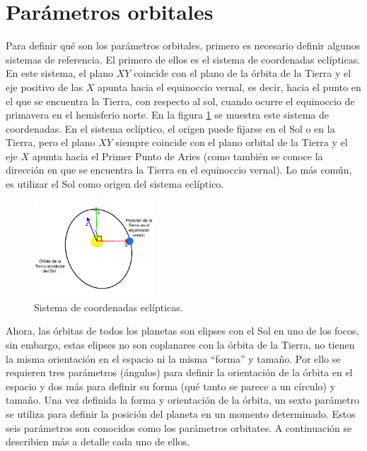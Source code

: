 \documentclass[a4paper,10pt]{article}
\begin{document}
\section{Parámetros orbitales}
Para definir qué son los parámetros orbitales, primero es necesario definir algunos sistemas de referencia. El primero de ellos es el sistema de coordenadas eclípticas. En este sistema, el plano $XY$ coincide con el plano de la órbita de la Tierra y el eje positivo de las $X$ apunta hacia el equinoccio vernal, es decir, hacia el punto en el que se encuentra la Tierra, con respecto al sol, cuando ocurre el equinoccio de primavera en el hemisferio norte. En la figura \ref{fig:EclipticFrame} se muestra este sistema de coordenadas. En el sistema eclíptico, el origen puede fijarse en el Sol o en la Tierra, pero el plano $XY$ siempre coincide con el plano orbital de la Tierra y el eje $X$ apunta hacia el Primer Punto de Aries (como también se conoce la dirección en que se encuentra la Tierra en el equinoccio vernal). Lo más común, es utilizar el Sol como origen del sistema eclíptico. 
\begin{figure}
  \centering
  \includegraphics[width=0.4\textwidth]{Figures/EclipticCoordinates.pdf}
  \caption{Sistema de coordenadas eclípticas.}
  \label{fig:EclipticFrame}
\end{figure}

Ahora, las órbitas de todos los planetas son elipses con el Sol en uno de los focos, sin embargo, estas elipses no son coplanares con la órbita de la Tierra, no tienen la misma orientación en el espacio ni la misma ``forma'' y tamaño. Por ello se requieren tres parámetros (ángulos) para definir la orientación de la órbita en el espacio y dos más para definir su forma (qué tanto se parece a un círculo) y tamaño. Una vez definida la forma y orientación de la órbita, un sexto parámetro se utiliza para definir la posición del planeta en un momento determinado. Estos seis parámetros son conocidos como los parámetros orbitates. A continuación se describien más a detalle cada uno de ellos.
\end{document}
